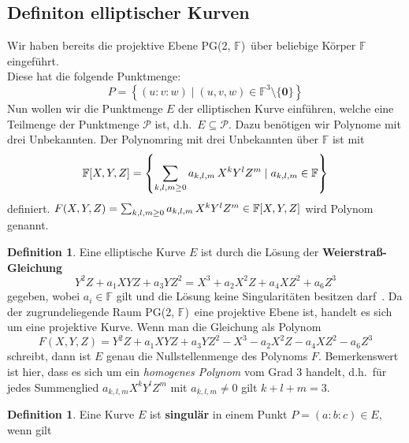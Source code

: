 \documentclass[hidelinks]{article}
\theoremstyle{plain}
\theoremstyle{definition}
\newtheorem{defn}[thm]{Definition}
\theoremstyle{rem}
\newcommand{\pgtwo}{PG(2, $\mathbb{F}$)\ }
\newcommand{\ftnz}{\mathbb{F}^{3}\setminus\{\boldsymbol 0\}}
\begin{document}
\begin{sloppypar}
\subsection{Definiton elliptischer Kurven} \label{definition-ek}
Wir haben bereits die projektive Ebene \pgtwo über beliebige Körper $\mathbb{F}$ eingeführt.\\
Diese hat die folgende Punktmenge:
\begin{equation*}
    P = \left\{(u:v:w) \mid (u,v,w) \in \ftnz \right\}
\end{equation*}
Nun wollen wir die Punktmenge $E$ der elliptischen Kurve einführen, welche eine Teilmenge der Punktmenge $\mathcal{P}$ ist, d.h.\ $E \subseteq \mathcal{P}$. 
Dazu benötigen wir Polynome mit drei Unbekannten.
Der Polynomring mit drei Unbekannten über $\mathbb{F}$ ist mit 
\begin{equation*}
    \mathbb{F}[X,Y,Z] = \left\{ \sum_{k,l,m \geq 0} a_{k,l,m} \thinspace X^k Y^l Z^m \mid a_{k,l,m} \in \mathbb{F} \right\}
\end{equation*}
definiert. 
$F(X,Y,Z) = \sum_{k,l,m \geq 0} a_{k,l,m} \thinspace X^k Y^l Z^m \in \mathbb{F}[X,Y,Z]$ wird Polynom genannt. 
\begin{defn}\label{weierstrass}
	Eine elliptische Kurve $E$ ist durch die Lösung der \textbf{Weierstraß-Gleichung} 
    \begin{equation*}
        Y^2Z + a_1XYZ + a_3YZ^2 = X^3 + a_2X^2Z + a_4XZ^2 + a_6Z^3
    \end{equation*}
    gegeben, wobei $a_i \in \mathbb{F}$ gilt und die Lösung keine Singularitäten besitzen darf~\cite[Seite~54]{milne2006}.
    Da der zugrundeliegende Raum \pgtwo eine projektive Ebene ist, handelt es sich um eine projektive Kurve. 
    Wenn man die Gleichung als Polynom 
    \begin{equation*}
        F(X,Y,Z) = Y^2Z + a_1XYZ + a_3YZ^2 - X^3 - a_2X^2Z - a_4XZ^2 -a_6Z^3
    \end{equation*}
    schreibt, dann ist $E$ genau die Nullstellenmenge des Polynoms $F$. Bemerkenswert ist hier, dass es sich um ein \textit{homogenes Polynom} vom Grad 3 handelt, d.h.\ für jedes Summenglied $a_{k,l,m}X^kY^lZ^m$ mit $a_{k,l,m} \neq 0$ gilt $k + l + m = 3$.
\end{defn}
\begin{defn} \label{singularitaeten}
	Eine Kurve $E$ ist \textbf{singulär} in einem Punkt \mbox{$P=(a:b:c)\in E$}, wenn gilt

\end{defn}
\end{sloppypar}
\end{document}
